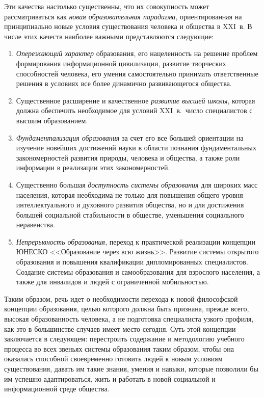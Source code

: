 \begin{multicols}{2}
     Эти качества настолько существенны, что их совокупность может рассматриваться
как \textit{новая образовательная парадигма}, ориентированная на принципиально новые
условия существования человека и общества в XXI~в. В числе этих качеств наиболее
важными представляются следующие:\\[-14.1pt]
     \begin{enumerate}[1.]
\item \textit{Опережающий характер} образования, его нацеленность на решение
проблем формирования информационной цивилизации, развитие творческих
способностей человека, его умения самостоятельно принимать ответственные решения
в условиях все более динамично развивающегося общества.\\[-14.1pt]
\item Существенное расширение и качественное \textit{развитие высшей школы},
которая должна обеспечить необходимое для условий XXI~в.\ число специалистов с
высшим образованием.\\[-14.1pt]
\item \textit{Фундаментализация образования} за счет его все большей ориентации на
изучение новейших достижений науки в области познания фундаментальных
закономерностей развития природы, человека и общества, а также роли информации в
реализации этих закономерностей.\\[-14.1pt]
\item Существенно большая \textit{доступность системы образования} для широких
масс населения, которая необходима не только для повышения общего уровня
интеллектуального и духовного развития общества, но и для достижения большей
социальной стабильности в обществе, уменьшения социального неравенства.\\[-14.1pt]
\item \textit{Непрерывность образования}, переход к практической реализации
концепции ЮНЕСКО <<Образование через всю жизнь>>. Развитие системы
открытого образования и повышения квалификации дипломированных специалистов.
Создание системы образования и самообразования для взрослого населения, а также
для инвалидов и людей с ограниченной мобильностью.
   \end{enumerate}

   Таким образом, речь идет о необходимости перехода к новой философской концепции
образования, целью которого должна быть признана, преж\-де всего, высокая
образованность человека, а не подготовка специалиста узкого профиля, как это в
большинстве случаев имеет место сегодня. Суть этой концепции заключается в 
следующем:
перестроить содержание и методологию учебного процесса во всех звеньях системы
образования таким образом, чтобы она оказалась способной своевременно готовить людей
к новым условиям существования, давать им такие знания, умения и навыки, которые
позволили бы им успешно адаптироваться, жить и работать в новой социальной и
информационной среде общества.


\end{multicols}
